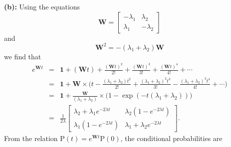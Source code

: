\textbf{(b):} Using the equations
\begin{equation}
\textbf{W} = \left[\begin{array}{cc} -\lambda_1 & \lambda_2 \\ \lambda_1 & -\lambda_2 \end{array}\right]
\end{equation}
and
\begin{equation}
\textbf{W}^2 = -(\lambda_1 + \lambda_2) \textbf{W}
\end{equation}
we find that
\begin{eqnarray}
e^{\textbf{W}t} &=& \textbf{1} + (\textbf{W}t) + \frac{(\textbf{W}t)^2}{2!} + \frac{(\textbf{W}t)^3}{3!} + \frac{(\textbf{W}t)^4}{4!} + \cdots \nonumber \\
&=& \textbf{1} + \textbf{W} \times \bigg( t - \frac{(\lambda_1 + \lambda_2)t^2}{2!} + \frac{(\lambda_1 + \lambda_2)^2 t^3}{3!} - \frac{(\lambda_1 + \lambda_2)^3 t^4}{4!} + \cdots \bigg) \nonumber \\
&=& \textbf{1} + \frac{\textbf{W}}{(\lambda_1 + \lambda_2)} \times \bigg(1-\exp(-t(\lambda_1 + \lambda_2))\bigg) \nonumber \\
&=& \frac{1}{2\lambda} \left[\begin{array}{cc} \lambda_2 + \lambda_1 e^{-2 \lambda t} & \lambda_2 (1-e^{-2 \lambda t}) \\ \lambda_1 (1-e^{-2 \lambda t}) & \lambda_1 + \lambda_2 e^{-2 \lambda t} \end{array}\right].
\end{eqnarray}
From the relation $\text{P}(t) = e^{\textbf{W}t} \text{P}(0)$, the conditional probabilities are
